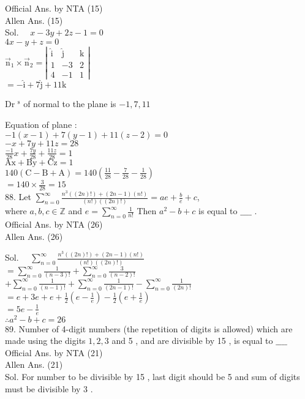 \documentclass[10pt]{article}
\begin{document}
Official Ans. by NTA (15)\\
Allen Ans. (15)\\
Sol. \(\quad x-3 y+2 z-1=0\)\\
\(4 x-y+z=0\)\\
\(\overrightarrow{\mathrm{n}}_{1} \times \overrightarrow{\mathrm{n}}_{2}=\left|\begin{array}{ccc}\hat{\mathrm{i}} & \hat{\mathrm{j}} & \mathrm{k} \\ 1 & -3 & 2 \\ 4 & -1 & 1\end{array}\right|\)\\
\(=-\hat{\mathrm{i}}+7 \hat{\mathrm{j}}+11 \mathrm{k}\)

Dr \(^{\mathrm{s}}\) of normal to the plane is \(-1,7,11\)

Equation of plane :\\
\(-1(x-1)+7(y-1)+11(z-2)=0\)\\
\(-x+7 y+11 z=28\)\\
\(\frac{-1}{28} x+\frac{7 y}{28}+\frac{11 z}{28}=1\)\\
\(\mathrm{Ax}+\mathrm{By}+\mathrm{Cz}=1\)\\
\(140(\mathrm{C}-\mathrm{B}+\mathrm{A})=140\left(\frac{11}{28}-\frac{7}{28}-\frac{1}{28}\right)\)\\
\(=140 \times \frac{3}{28}=15\)\\
88. Let \(\sum_{n=0}^{\infty} \frac{n^{3}((2 n)!)+(2 n-1)(n!)}{(n!)((2 n)!)}=a e+\frac{b}{e}+c\),\\
where \(a, b, c \in \mathbb{Z}\) and \(e=\sum_{n=0}^{\infty} \frac{1}{n!}\) Then \(a^{2}-b+c\) is equal to \(\_\_\_\_\) .\\
Official Ans. by NTA (26)\\
Allen Ans. (26)

Sol. \(\quad \sum_{n=0}^{\infty} \frac{n^{3}((2 n)!)+(2 n-1)(n!)}{(n!)((2 n)!)}\)\\
\(=\sum_{n=0}^{\infty} \frac{1}{(n-3)!}+\sum_{n=0}^{\infty} \frac{3}{(n-2)!}\)\\
\(+\sum_{n=0}^{\infty} \frac{1}{(n-1)!}+\sum_{n=0}^{\infty} \frac{1}{(2 n-1)!}-\sum_{n=0}^{\infty} \frac{1}{(2 n)!}\)\\
\(=e+3 e+e+\frac{1}{2}\left(e-\frac{1}{e}\right)-\frac{1}{2}\left(e+\frac{1}{e}\right)\)\\
\(=5 e-\frac{1}{e}\)\\
\(\therefore a^{2}-b+c=26\)\\
89. Number of 4-digit numbers (the repetition of digits is allowed) which are made using the digits \(1,2,3\) and 5 , and are divisible by 15 , is equal to \(\_\_\_\_\)\\
Official Ans. by NTA (21)\\
Allen Ans. (21)\\
Sol. For number to be divisible by 15 , last digit should be 5 and sum of digits must be divisible by 3 .
\end{document}
